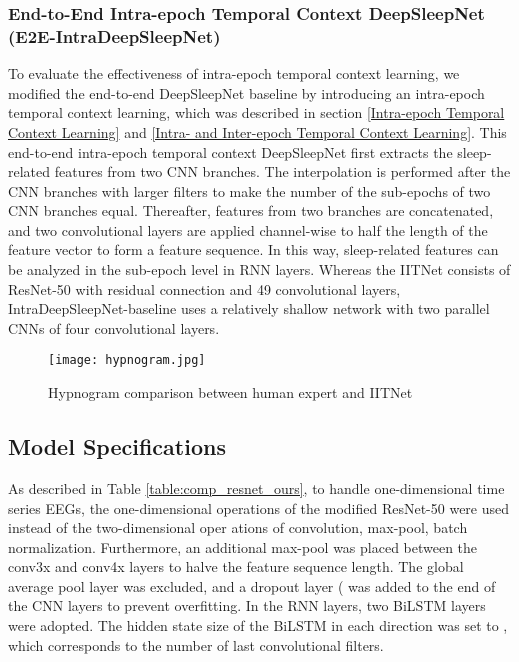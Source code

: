 \documentclass[10pt,twocolumn,twoside]{IEEEtran}
\begin{document}
    \subsubsection{End-to-End Intra-epoch Temporal Context DeepSleepNet (E2E-IntraDeepSleepNet)}
    To evaluate the effectiveness of intra-epoch temporal context learning, we modified the end-to-end DeepSleepNet baseline by introducing an intra-epoch temporal context learning, which was described in section \ref{Intra-epoch Temporal Context Learning} and \ref{Intra- and Inter-epoch Temporal Context Learning}. This end-to-end intra-epoch temporal context DeepSleepNet first extracts the sleep-related features from two CNN branches. The interpolation is performed after the CNN branches with larger filters to make the number of the sub-epochs of two CNN branches equal. Thereafter, features from two branches are concatenated, and two convolutional layers are applied channel-wise to half the length of the feature vector to form a feature sequence. In this way, sleep-related features can be analyzed in the sub-epoch level in RNN layers. Whereas the IITNet consists of ResNet-50 with residual connection and 49 convolutional layers, IntraDeepSleepNet-baseline uses a relatively shallow network with two parallel CNNs of four convolutional layers.

    \begin{figure*}[bh!]
    \centering
      \texttt{[image: hypnogram.jpg]}
      \caption{Hypnogram comparison between human expert and IITNet}  
      \label{fig:hypnogram}
    \end{figure*}    

    \subsection{Model Specifications}
    
    As described in Table \ref{table:comp_resnet_ours}, to handle one-dimensional time series EEGs, the one-dimensional operations of the modified ResNet-50 \cite{he2016deep} were used instead of the two-dimensional oper ations of convolution, max-pool, batch normalization. Furthermore, an additional max-pool was placed between the conv3x and conv4x layers to halve the feature sequence length. The global average pool layer was excluded, and a dropout layer ( was added to the end of the CNN layers to prevent overfitting. In the RNN layers, two BiLSTM layers were adopted. The hidden state size of the BiLSTM in each direction was set to , which corresponds to the number of last convolutional filters.
    
\end{document}
